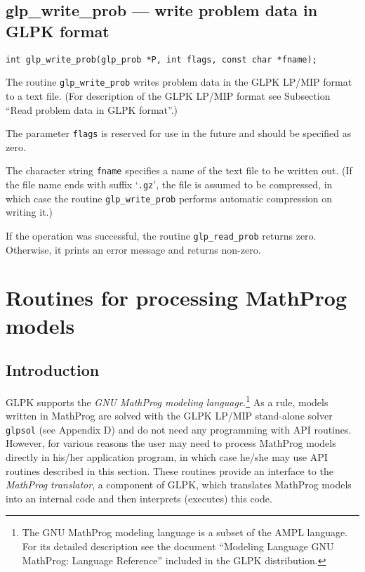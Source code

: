 \newpage

\subsection{glp\_write\_prob --- write problem data in GLPK format}

\synopsis

\begin{verbatim}
int glp_write_prob(glp_prob *P, int flags, const char *fname);
\end{verbatim}

\description

The routine \verb|glp_write_prob| writes problem data in the GLPK
LP/MIP format to a text file. (For description of the GLPK LP/MIP
format see Subsection ``Read problem data in GLPK format''.)

The parameter \verb|flags| is reserved for use in the future and should
be specified as zero.

The character string \verb|fname| specifies a name of the text file to
be written out. (If the file name ends with suffix `\verb|.gz|', the
file is assumed to be compressed, in which case the routine
\verb|glp_write_prob| performs automatic compression on writing it.)

\returns

If the operation was successful, the routine \verb|glp_read_prob|
returns zero. Otherwise, it prints an error message and returns
non-zero.


\newpage

\section{Routines for processing MathProg models}

\subsection{Introduction}

GLPK supports the {\it GNU MathProg modeling language}.\footnote{The
GNU MathProg modeling language is a subset of the AMPL language. For
its detailed description see the document ``Modeling Language GNU
MathProg: Language Reference'' included in the GLPK distribution.}
As a rule, models written in MathProg are solved with the GLPK LP/MIP
stand-alone solver \verb|glpsol| (see Appendix D) and do not need any
programming with API routines. However, for various reasons the user
may need to process MathProg models directly in his/her application
program, in which case he/she may use API routines described in this
section. These routines provide an interface to the {\it MathProg
translator}, a component of GLPK, which translates MathProg models into
an internal code and then interprets (executes) this code.

